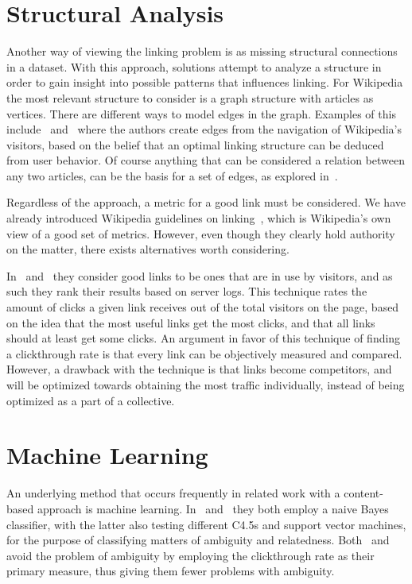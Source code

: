 \section{Structural Analysis}\label{related_structural_analysis}

Another way of viewing the linking problem is as missing structural connections in a dataset. With this approach, solutions attempt to analyze a structure in order to gain insight into possible patterns that influences linking. For Wikipedia the most relevant structure to consider is a graph structure with articles as vertices. There are different ways to model edges in the graph. Examples of this include~\cite{hyperlink-structure-using-logs} and~\cite{west2015mining} where the authors create edges from the navigation of Wikipedia's visitors, based on the belief that an optimal linking structure can be deduced from user behavior. Of course anything that can be considered a relation between any two articles, can be the basis for a set of edges, as explored in~\cite{lu2011link}.

Regardless of the approach, a metric for a good link must be considered. We have already introduced Wikipedia guidelines on linking~\cite{wiki-editor-guidelines}, which is Wikipedia's own view of a good set of metrics. However, even though they clearly hold authority on the matter, there exists alternatives worth considering.

In~\cite{hyperlink-structure-using-logs} and~\cite{west2015mining} they consider good links to be ones that are in use by visitors, and as such they rank their results based on server logs. This technique rates the amount of clicks a given link receives out of the total visitors on the page, based on the idea that the most useful links get the most clicks, and that all links should at least get some clicks. An argument in favor of this technique of finding a clickthrough rate is that every link can be objectively measured and compared. However, a drawback with the technique is that links become competitors, and will be optimized towards obtaining the most traffic individually, instead of being optimized as a part of a collective. 

\section{Machine Learning}\label{related_machine_learning}

An underlying method that occurs frequently in related work with a content-based approach is machine learning. In~\cite{mihalcea2007wikify} and~\cite{milne2008learning} they both employ a naive Bayes classifier, with the latter also testing different C4.5s and support vector machines, for the purpose of classifying matters of ambiguity and relatedness. Both~\cite{hyperlink-structure-using-logs} and~\cite{west2015mining} avoid the problem of ambiguity by employing the clickthrough rate as their primary measure, thus giving them fewer problems with ambiguity. 

